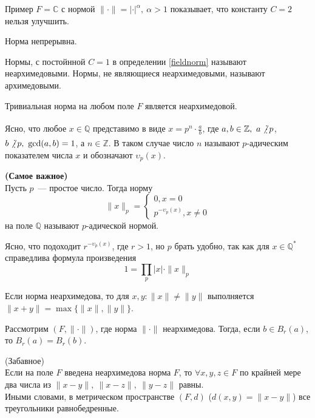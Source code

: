 \documentclass[11pt]{article}
\begin{document}
    \begin{remark}
        Пример $F = \mathbb{C}$ с нормой $\| \cdot \| = | \cdot |^{\alpha}, \ \alpha > 1$ показывает, что константу $C = 2$ нельзя улучшить.
    \end{remark}
    \begin{corollary}
        Норма непрерывна.
    \end{corollary}
    \begin{definition}
        Нормы, с постойнной $C = 1$ в определении \ref{fieldnorm} называют неархимедовыми. Нормы, не являющиеся неархимедовыми,
        называют архимедовыми.
    \end{definition}
    \begin{example}
        Тривиальная норма на любом поле $F$ является неархимедовой.
    \end{example}
    \begin{definition}
        Ясно, что любое $x \in \mathbb{Q}$ представимо в виде $x = p^n \cdot \frac{a}{b}$, где $a, b \in \mathbb{Z}, \ a \not\divisible p$, $b \not\divisible p, \ \gcd(a, b) = 1$, а $n \in \mathbb{Z}$.
        В таком случае число $n$ называют $p$-адическим показателем числа $x$ и обозначают $\upsilon_p(x)$.
    \end{definition}
    \begin{definition} \textbf{(Самое важное)}\\
    Пусть $p$~--- простое число. Тогда норму
        \[ \| x \|_{p} = \begin{cases} 0, x = 0 \\ p^{-\upsilon_p(x)}, x \neq 0  \end{cases}\]
    на поле $\mathbb{Q}$ называют $p$-адической нормой.
    \end{definition}

    \begin{remark}
        Ясно, что подоходит $r^{-\upsilon_p(x)}$, где $r > 1$, но $p$ брать удобно, так как для $x \in \mathbb{Q}^{*}$ справедлива формула произведения
        \[ 1 = \prod\limits_{p} |x| \cdot  \| x \|_{p} \]
    \end{remark}
    \begin{lemma}
        Если норма неархимедова, то для $x, y\colon \| x \| \neq \| y \|$ выполняется $\| x + y \| = \max\{\| x \|, \| y \| \}$.
    \end{lemma}
    \begin{corollary}
        Рассмотрим $(F, \| \cdot \| )$, где норма $\| \cdot \|$ неархимедова. Тогда, если  $b \in B_r(a)$, то $B_r(a) = B_r(b)$.
     \end{corollary}
    \begin{corollary} (Забавное)\\
        Если на поле $F$ введена неархимедова норма $F$, то $\forall x, y, z \in F$ по крайней мере два числа из
        $\| x - y \|, \ \| x - z \|, \ \| y - z\| $ равны. \\
        Иными словами, в метрическом пространстве $(F, d)$ ($d(x, y) = \| x - y \| $) все треугольники равнобедренные.
    \end{corollary}
\end{document}
